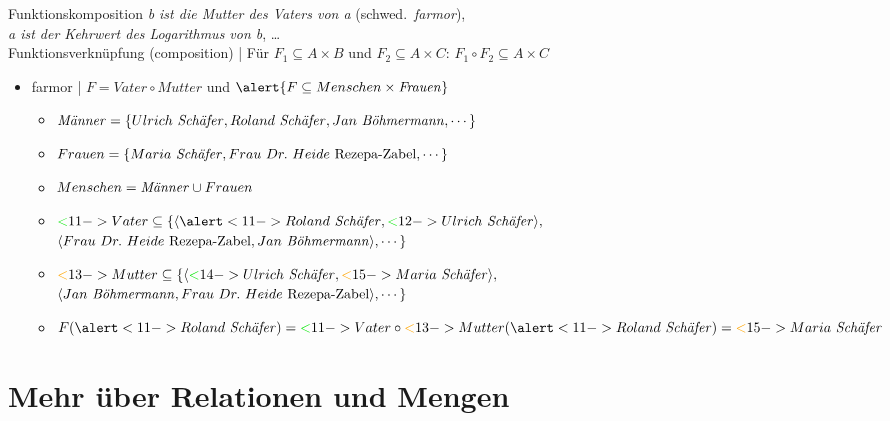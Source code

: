 \begin{frame}
  {Funktionskomposition}
  \onslide<+->
  \onslide<+->
  \textit{b ist die Mutter des Vaters von a} (schwed.\ \textit{farmor}),\\
  \textit{a ist der Kehrwert des Logarithmus von b}, \ldots\\
  \Halbzeile
  \onslide<+->
  Funktionsverknüpfung (composition) | Für $F_1\subseteq A\times B$ und $F_2\subseteq A\times C$: \alert{$F_1\circ F_2\subseteq A\times C$}\\
  \Halbzeile
  \begin{itemize}[<+->]
    \item \alert{farmor | $F=Vater\circ Mutter$} und $\alert{F\subseteq Menschen\times\text{\textit{Frauen}}}$
      \begin{itemize}[<+->]
        \item $\text{\textit{Männer}}=\{Ulrich\ \text{\textit{Schäfer}}, Roland\ \text{\textit{Schäfer}}, Jan\ \text{\textit{Böhmermann}}, \cdots\}$
        \item $Frauen=\{Maria\ \text{\textit{Schäfer}},Frau\ Dr.\ Heide\ \text{Rezepa-Zabel}, \cdots\}$
        \item $Menschen=\text{\textit{Männer}}\cup Frauen$
          \Halbzeile
        \item $\gruen<11->{Vater}\subseteq\{\tuple{\alert<11->{Roland\ \text{\textit{Schäfer}}},\gruen<12->{Ulrich\ \text{\textit{Schäfer}}}},$\\
          $\langle{}Frau\ Dr.\ Heide\ \text{Rezepa-Zabel}, Jan\ \text{\textit{Böhmermann}}\rangle, \cdots\}$
          \Halbzeile
        \item $\orongsch<13->{Mutter}\subseteq\{\tuple{\gruen<14->{Ulrich\ \text{\textit{Schäfer}}},\orongsch<15->{Maria\ \text{\textit{Schäfer}}}},$\\
          $\tuple{Jan\ \text{\textit{Böhmermann}},Frau\ Dr.\ Heide\ \text{Rezepa-Zabel}}, \cdots\}$
          \Halbzeile
        \item $F(\alert<11->{Roland\ \text{\textit{Schäfer}}})=\gruen<11->{Vater}\circ \orongsch<13->{Mutter}(\alert<11->{Roland\ \text{\textit{Schäfer}}})=\orongsch<15->{Maria\ \text{\textit{Schäfer}}}$
      \end{itemize}
  \end{itemize}
\end{frame}

\section{Mehr über Relationen und Mengen}

